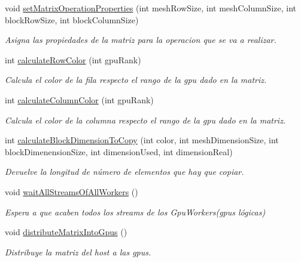 \begin{DoxyCompactItemize}
void \hyperlink{classMatrixMain_a955eceba34f3a4b617a6fab1a97159cd}{set\+Matrix\+Operation\+Properties} (int mesh\+Row\+Size, int mesh\+Column\+Size, int block\+Row\+Size, int block\+Column\+Size)
\begin{DoxyCompactList}\small\item\em Asigna las propiedades de la matriz para la operacion que se va a realizar. \end{DoxyCompactList}\item 
int \hyperlink{classMatrixMain_aa45d7ed84d54e7ff0f78898fe6441915}{calculate\+Row\+Color} (int gpu\+Rank)
\begin{DoxyCompactList}\small\item\em Calcula el color de la fila respecto el rango de la gpu dado en la matriz. \end{DoxyCompactList}\item 
int \hyperlink{classMatrixMain_a52d6d01aecf191f9d4d3045e7f5f9feb}{calculate\+Column\+Color} (int gpu\+Rank)
\begin{DoxyCompactList}\small\item\em Calcula el color de la columna respecto el rango de la gpu dado en la matriz. \end{DoxyCompactList}\item 
int \hyperlink{classMatrixMain_a412ed02c2cf14dcada84239e68d1a1a3}{calculate\+Block\+Dimension\+To\+Copy} (int color, int mesh\+Dimension\+Size, int block\+Dimenension\+Size, int dimension\+Used, int dimension\+Real)
\begin{DoxyCompactList}\small\item\em Devuelve la longitud de número de elementos que hay que copiar. \end{DoxyCompactList}\item 
\mbox{\label{classMatrixMain_a9eb7a40ddf04ad2f3544105ef53353d9}} 
void \hyperlink{classMatrixMain_a9eb7a40ddf04ad2f3544105ef53353d9}{wait\+All\+Streams\+Of\+All\+Workers} ()
\begin{DoxyCompactList}\small\item\em Espera a que acaben todos los streams de los Gpu\+Workers(gpus lógicas) \end{DoxyCompactList}\item 
\mbox{\label{classMatrixMain_a5b3e50c4ba5173abbbc4c0b90c9e546d}} 
void \hyperlink{classMatrixMain_a5b3e50c4ba5173abbbc4c0b90c9e546d}{distribute\+Matrix\+Into\+Gpus} ()
\begin{DoxyCompactList}\small\item\em Distribuye la matriz del host a las gpus. \end{DoxyCompactList}\item 

\end{DoxyCompactItemize}
